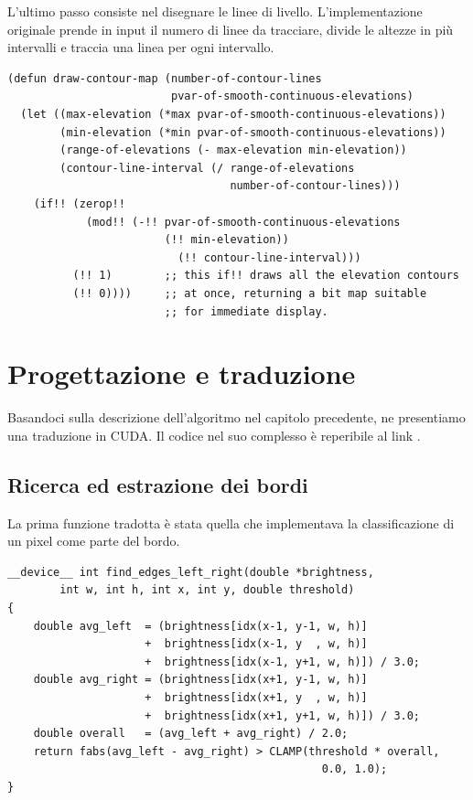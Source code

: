 \documentclass[12pt,a4paper,openright,twoside]{report}
\begin{document}
L'ultimo passo consiste nel disegnare le linee di livello. L'implementazione originale prende in input il numero di linee da tracciare, divide le altezze in più intervalli e traccia una linea per ogni intervallo.

\begin{lstlisting}[style=mystyle]
(defun draw-contour-map (number-of-contour-lines
                         pvar-of-smooth-continuous-elevations)
  (let ((max-elevation (*max pvar-of-smooth-continuous-elevations))
        (min-elevation (*min pvar-of-smooth-continuous-elevations))
        (range-of-elevations (- max-elevation min-elevation))
        (contour-line-interval (/ range-of-elevations
                                  number-of-contour-lines)))
    (if!! (zerop!!
            (mod!! (-!! pvar-of-smooth-continuous-elevations
                        (!! min-elevation))
                          (!! contour-line-interval)))
          (!! 1)        ;; this if!! draws all the elevation contours
          (!! 0))))     ;; at once, returning a bit map suitable
                        ;; for immediate display.
\end{lstlisting}

\chapter{Progettazione e traduzione}

Basandoci sulla descrizione dell'algoritmo nel capitolo precedente, ne presentiamo una traduzione in CUDA. Il codice nel suo complesso è reperibile al link \cite{thecode}.

\section{Ricerca ed estrazione dei bordi}

La prima funzione tradotta è stata quella che implementava la classificazione di un pixel come parte del bordo.

\begin{lstlisting}[style=mystyle]
__device__ int find_edges_left_right(double *brightness,
        int w, int h, int x, int y, double threshold)
{
    double avg_left  = (brightness[idx(x-1, y-1, w, h)]
                     +  brightness[idx(x-1, y  , w, h)]
                     +  brightness[idx(x-1, y+1, w, h)]) / 3.0;
    double avg_right = (brightness[idx(x+1, y-1, w, h)]
                     +  brightness[idx(x+1, y  , w, h)]
                     +  brightness[idx(x+1, y+1, w, h)]) / 3.0;
    double overall   = (avg_left + avg_right) / 2.0;
    return fabs(avg_left - avg_right) > CLAMP(threshold * overall,
                                                0.0, 1.0);
}
\end{lstlisting}
\end{document}
